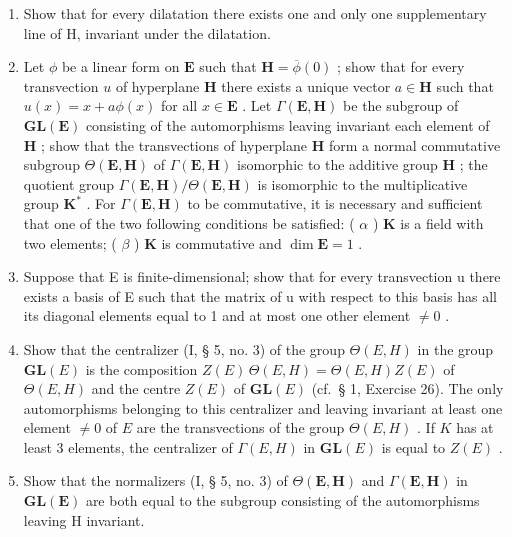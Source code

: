 \begin{enumerate}
\def\labelenumi{(\alph{enumi})}
\item
  Show that for every dilatation there exists one and only one supplementary line of H, invariant under the dilatation.
\item
  Let \(\phi\) be a linear form on \(\mathbf{E}\) such that \(\mathbf{H} = \overline{\phi}(0)\) ; show that for every transvection \(u\) of hyperplane \(\mathbf{H}\) there exists a unique vector \(a \in \mathbf{H}\) such that \(u(x) = x + a\phi(x)\) for all \(x \in \mathbf{E}\) . Let \(\Gamma(\mathbf{E}, \mathbf{H})\) be the subgroup of \(\mathbf{GL}(\mathbf{E})\) consisting of the automorphisms leaving invariant each element of \(\mathbf{H}\) ; show that the transvections of hyperplane \(\mathbf{H}\) form a normal commutative subgroup \(\Theta(\mathbf{E}, \mathbf{H})\) of \(\Gamma(\mathbf{E}, \mathbf{H})\) isomorphic to the additive group \(\mathbf{H}\) ; the quotient group \(\Gamma(\mathbf{E}, \mathbf{H}) / \Theta(\mathbf{E}, \mathbf{H})\) is isomorphic to the multiplicative group \(\mathbf{K}^*\) . For \(\Gamma(\mathbf{E}, \mathbf{H})\) to be commutative, it is necessary and sufficient that one of the two following conditions be satisfied: ( \(\alpha\) ) \(\mathbf{K}\) is a field with two elements; ( \(\beta\) ) \(\mathbf{K}\) is commutative and \(\dim \mathbf{E} = 1\) .
\item
  Suppose that E is finite-dimensional; show that for every transvection u there exists a basis of E such that the matrix of u with respect to this basis has all its diagonal elements equal to 1 and at most one other element \(\neq0\) .
\item
  Show that the centralizer (I, § 5, no. 3) of the group \(\Theta(E, H)\) in the group \(\mathbf{GL}(E)\) is the composition \(Z(E)\,\Theta(E, H) = \Theta(E, H)Z(E)\) of \(\Theta(E, H)\) and the centre \(Z(E)\) of \(\mathbf{GL}(E)\) (cf.~§ 1, Exercise 26). The only automorphisms belonging to this centralizer and leaving invariant at least one element \(\neq0\) of \(E\) are the transvections of the group \(\Theta(E, H)\) . If \(K\) has at least 3 elements, the centralizer of \(\Gamma(E, H)\) in \(\mathbf{GL}(E)\) is equal to \(Z(E)\) .
\item
  Show that the normalizers (I, § 5, no. 3) of \(\Theta(\mathbf{E},\mathbf{H})\) and \(\Gamma(\mathbf{E},\mathbf{H})\) in \(\mathbf{GL}(\mathbf{E})\) are both equal to the subgroup consisting of the automorphisms leaving H invariant.
\end{enumerate}

